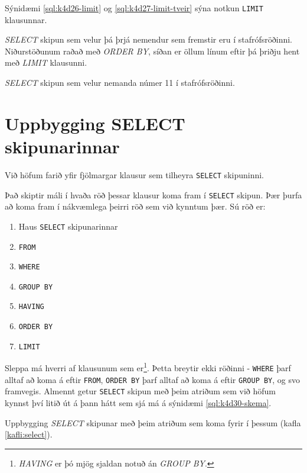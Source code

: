 Sýnidæmi \ref{sql:k4d26-limit} og \ref{sql:k4d27-limit-tveir} sýna notkun \verb|LIMIT| klausunnar.

\begin{example}
\caption[LIMIT]{\emph{SELECT} skipun sem velur þá þrjá nemendur sem fremstir eru í stafrófsröðinni. Niðurstöðunum raðað með \emph{ORDER BY}, síðan er öllum línum eftir þá þriðju hent með \emph{LIMIT} klausunni.}
\label{sql:k4d26-limit}
\centering
{}
\end{example}

\begin{example}
\caption[LIMIT með tveimur tölum]{\emph{SELECT} skipun sem velur nemanda númer 11 í stafrófsröðinni.}
\label{sql:k4d27-limit-tveir}
\centering
{}
\end{example}
\section{Uppbygging SELECT skipunarinnar}
Við höfum farið yfir fjölmargar klausur sem tilheyra \verb|SELECT| skipuninni.

Það skiptir máli í hvaða röð þessar klausur koma fram í \verb|SELECT| skipun. Þær þurfa að koma fram í nákvæmlega þeirri röð sem við kynntum þær. Sú röð er:

\begin{enumerate}
 \setcounter{enumi}{0}
 \item Haus \verb|SELECT| skipunarinnar
 \item \verb|FROM|
 \item \verb|WHERE|
 \item \verb|GROUP BY|
 \item \verb|HAVING|
 \item \verb|ORDER BY|
 \item \verb|LIMIT|
\end{enumerate}

Sleppa má hverri af klausunum sem er\footnote{\emph{HAVING} er þó mjög sjaldan notuð án \emph{GROUP BY}.}. Þetta breytir ekki röðinni - \verb|WHERE| þarf alltaf að koma á eftir \verb|FROM|, \verb|ORDER BY| þarf alltaf að koma á eftir \verb|GROUP BY|, og svo framvegis. Almennt getur \verb|SELECT| skipun með þeim atriðum sem við höfum kynnst því litið út á þann hátt sem sjá má á sýnidæmi \ref{sql:k4d30-skema}.

\begin{example}
\caption[Uppbygging]{Uppbygging \emph{SELECT} skipunar með þeim atriðum sem koma fyrir í þessum (kafla \ref{kafli:select}).}
\label{sql:k4d30-skema}
\centering
{}
\end{example}


